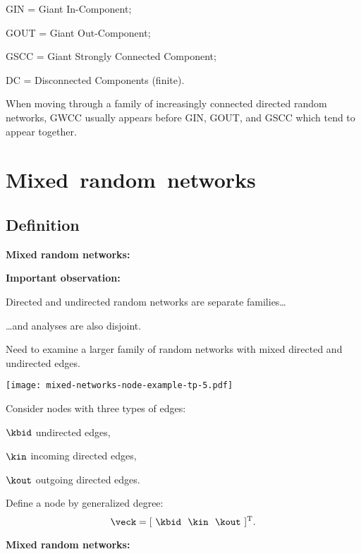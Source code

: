       GIN = Giant In-Component;
     
      GOUT = Giant Out-Component;
     
      GSCC = Giant Strongly Connected Component;
     
      DC = Disconnected Components (finite).
    
  
  
  
    When moving through a family of increasingly connected directed
    random networks, GWCC usually appears before GIN, GOUT, and GSCC which
    tend to appear together.\cite{newman2001b,boguna2005a}
  



\section{Mixed\ random\ networks}

\subsection{Definition}

  \textbf{Mixed random networks:}
  
  \textbf{Important observation:}
    
    
      Directed and undirected random networks are separate families\ldots
    
      \ldots and analyses are also disjoint.
    
      Need to examine a larger family of random networks
      with mixed directed and undirected edges.
    
  

      
    
          
      \texttt{[image: mixed-networks-node-example-tp-5.pdf]}
      
      
      
        Consider nodes with three types of edges:
        
        
          $\kbid$ undirected edges,
        
          $\kin$ incoming directed edges,
        
          $\kout$ outgoing directed edges.
        
      
        Define a node by generalized degree:
        $$
        \veck = [\ \kbid \ \  \kin \ \ \kout\ ]^{\textnormal{T}}.
        $$
      
      

  \textbf{Mixed random networks:}
  
